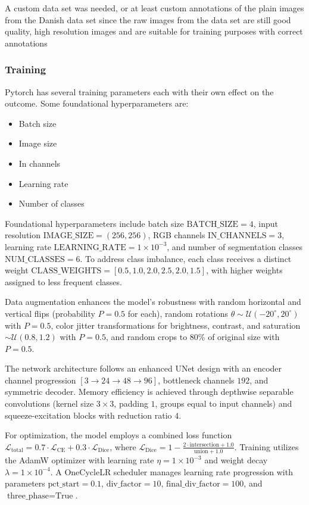 \documentclass[final]{cmpreport_02}
\begin{document}
A custom data set was needed, or at least custom annotations of the plain images from the Danish data set since the raw images from the data set are still good quality, high resolution images and are suitable for training purposes with correct annotations
\subsubsection{Training}
Pytorch has several training parameters each with their own effect on the outcome. Some foundational hyperparameters are:

\begin{itemize}
	\item{Batch size}
	\item{Image size}
	\item{In channels}
	\item{Learning rate}
	\item{Number of classes}
\end{itemize}

Foundational hyperparameters include batch size $\text{BATCH\_SIZE} = 4$, input resolution $\text{IMAGE\_SIZE} = (256, 256)$, RGB channels $\text{IN\_CHANNELS} = 3$, learning rate $\text{LEARNING\_RATE} = 1 \times 10^{-3}$, and number of segmentation classes $\text{NUM\_CLASSES} = 6$. To address class imbalance, each class receives a distinct weight $\text{CLASS\_WEIGHTS} = [0.5, 1.0, 2.0, 2.5, 2.0, 1.5]$, with higher weights assigned to less frequent classes.

Data augmentation enhances the model's robustness with random horizontal and vertical flips (probability $P = 0.5$ for each), random rotations $\theta \sim \mathcal{U}(-20^{\circ}, 20^{\circ})$ with $P = 0.5$, color jitter transformations for brightness, contrast, and saturation $\sim \mathcal{U}(0.8, 1.2)$ with $P = 0.5$, and random crops to 80\% of original size with $P = 0.5$.

The network architecture follows an enhanced UNet design with an encoder channel progression $[3 \rightarrow 24 \rightarrow 48 \rightarrow 96]$, bottleneck channels $192$, and symmetric decoder. Memory efficiency is achieved through depthwise separable convolutions (kernel size $3 \times 3$, padding $1$, groups equal to input channels) and squeeze-excitation blocks with reduction ratio $4$.

For optimization, the model employs a combined loss function $\mathcal{L}_{\text{total}} = 0.7 \cdot \mathcal{L}_{\text{CE}} + 0.3 \cdot \mathcal{L}_{\text{Dice}}$, where $\mathcal{L}_{\text{Dice}} = 1 - \frac{2 \cdot \text{intersection} + 1.0}{\text{union} + 1.0}$. Training utilizes the AdamW optimizer with learning rate $\eta = 1 \times 10^{-3}$ and weight decay $\lambda = 1 \times 10^{-4}$. A OneCycleLR scheduler manages learning rate progression with parameters $\text{pct\_start} = 0.1$, $\text{div\_factor} = 10$, $\text{final\_div\_factor} = 100$, and $\text{three\_phase} = \text{True}$.
\end{document}
